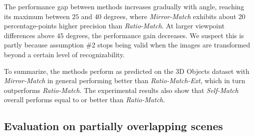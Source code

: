 \documentclass[review]{elsarticle}
\begin{document}
The performance gap between methods increases gradually with angle, reaching its maximum between $25$ and $40$ degrees, where \emph{Mirror-Match} exhibits about 20 percentage-points higher precision than \emph{Ratio-Match}. At larger viewpoint differences above $45$ degrees, the performance gain decreases.  We suspect this is partly because assumption \#2 stops being valid when the images are transformed beyond a certain level of recognizability.

To summarize, the methods perform as predicted on the 3D Objects dataset with \emph{Mirror-Match} in general performing better than \emph{Ratio-Match-Ext}, which in turn outperforms \emph{Ratio-Match}. The experimental results also show that \emph{Self-Match} overall performs equal to or better than \emph{Ratio-Match}.

\subsection{Evaluation on partially overlapping scenes}
\label{S:patches}
%
\end{document}
